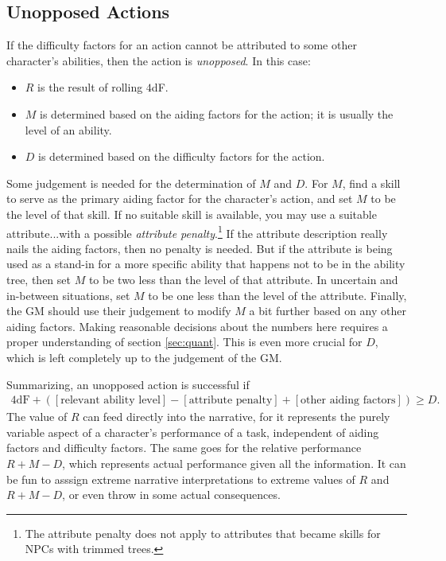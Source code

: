 \documentclass[12pt]{article}
\begin{document}
\subsection{Unopposed Actions}\label{sec:unopposed}
If the difficulty factors for an action cannot be attributed to some other character's abilities,
then the action is \emph{unopposed}.
In this case:
\vspace{-1em}
\begin{itemize}
\item $R$ is the result of rolling $4$dF.
\item $M$ is determined based on the aiding factors for the action; it is usually the level of an ability.
\item $D$ is determined based on the difficulty factors for the action.
\end{itemize}
Some judgement is needed for the determination of $M$ and $D$. For $M$,
find a skill to serve as the primary aiding factor for the character's action,
and set $M$ to be the level of that skill.
If no suitable skill is available, you may use a suitable attribute...with a possible \emph{attribute penalty}.\footnote{
The attribute penalty does not apply to attributes that became skills for NPCs with trimmed trees.}
If the attribute description really nails the aiding factors, then no penalty is needed.
But if the attribute is being used as a stand-in for a more specific ability that happens not to be in the ability tree,
then set $M$ to be two less than the level of that attribute.
In uncertain and in-between situations, set $M$ to be one less than the level of the attribute.
Finally, the GM should use their judgement to modify $M$ a bit further based on any other aiding factors.
Making reasonable decisions about the numbers here requires a proper understanding of section \ref{sec:quant}.
This is even more crucial for $D$, which is left completely up to the judgement of the GM.

Summarizing, an unopposed action is successful if
\begin{align*}
4\text{dF}
+([\text{relevant ability level}]
-[\text{attribute penalty}]
+[\text{other aiding factors}])
\geq D.
\end{align*}
The value of $R$ can feed directly into the narrative,
for it represents the purely variable aspect of a character's performance of a task,
independent of aiding factors and difficulty factors.
The same goes for the relative performance $R+M-D$, which represents actual performance given all the information.
It can be fun to asssign extreme narrative interpretations to extreme values of $R$ and $R+M-D$,
or even throw in some actual consequences.
\end{document}
